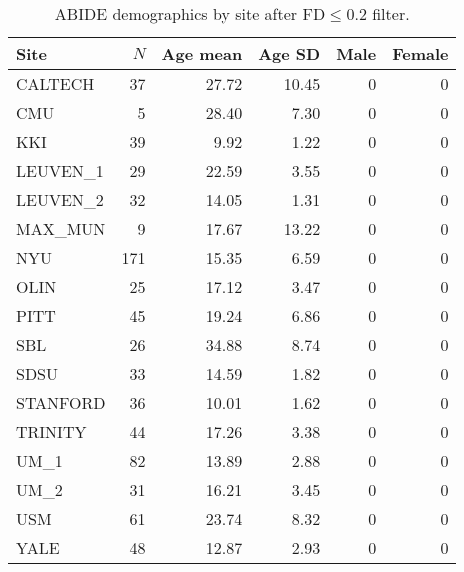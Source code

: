 \begin{table}[t]
\centering
\setlength{\tabcolsep}{6pt}
\begin{tabular}{lrrrrr}
\toprule
Site & $N$ & Age mean & Age SD & Male & Female \\
\midrule
CALTECH & 37 & 27.72 & 10.45 & 0 & 0 \\
CMU & 5 & 28.40 & 7.30 & 0 & 0 \\
KKI & 39 & 9.92 & 1.22 & 0 & 0 \\
LEUVEN\_1 & 29 & 22.59 & 3.55 & 0 & 0 \\
LEUVEN\_2 & 32 & 14.05 & 1.31 & 0 & 0 \\
MAX\_MUN & 9 & 17.67 & 13.22 & 0 & 0 \\
NYU & 171 & 15.35 & 6.59 & 0 & 0 \\
OLIN & 25 & 17.12 & 3.47 & 0 & 0 \\
PITT & 45 & 19.24 & 6.86 & 0 & 0 \\
SBL & 26 & 34.88 & 8.74 & 0 & 0 \\
SDSU & 33 & 14.59 & 1.82 & 0 & 0 \\
STANFORD & 36 & 10.01 & 1.62 & 0 & 0 \\
TRINITY & 44 & 17.26 & 3.38 & 0 & 0 \\
UM\_1 & 82 & 13.89 & 2.88 & 0 & 0 \\
UM\_2 & 31 & 16.21 & 3.45 & 0 & 0 \\
USM & 61 & 23.74 & 8.32 & 0 & 0 \\
YALE & 48 & 12.87 & 2.93 & 0 & 0 \\
\bottomrule
\end{tabular}
\caption{ABIDE demographics by site after FD$\leq$0.2 filter.}
\label{tab:demographics_by_site}
\end{table}